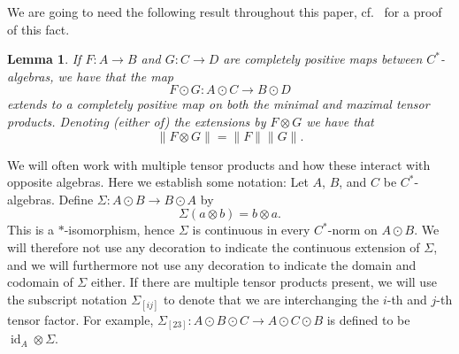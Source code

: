 \documentclass[11pt, a4paper, oneside, final, reqno]{amsart}
\newcommand{\id}{\operatorname{id}}
\theoremstyle{definition}
\theoremstyle{plain}
\newtheorem{lemma}[definition]{Lemma}
\theoremstyle{remark}
\numberwithin{equation}{section}
\begin{document}
We are going to need the following result throughout this paper, cf.~\cite[Theorem 3.5.3]{BO} for a proof of this fact.

\begin{lemma}\label{lemma:Continuity of tensor product maps}
    If $F \colon A \to B$ and $G \colon C \to D$ are completely positive maps between $C^*$-algebras, we have that the map
    \begin{equation*}
        F \odot G \colon A \odot C \to B \odot D
    \end{equation*}
    extends to a completely positive map on both the minimal and maximal tensor products. Denoting (either of) the extensions by $F \otimes G$ we have that
    \begin{equation*}
        \|F \otimes G\| = \|F\|\|G\|.
    \end{equation*}
\end{lemma}

We will often work with multiple tensor products and how these interact with opposite algebras. Here we establish some notation: Let $A$, $B$, and $C$ be $C^*$-algebras. Define $\Sigma \colon A \odot B \to B \odot A$ by
\begin{equation*}
    \Sigma(a \otimes b) = b \otimes a.
\end{equation*}
This is a $*$-isomorphism, hence $\Sigma$ is continuous in every $C^*$-norm on $A \odot B$. We will therefore not use any decoration to indicate the continuous extension of $\Sigma$, and we will furthermore not use any decoration to indicate the domain and codomain of $\Sigma$ either. If there are multiple tensor products present, we will use the subscript notation $\Sigma_{[ij]}$ to denote that we are interchanging the $i$-th and $j$-th tensor factor. For example, $\Sigma_{[23]} \colon A \odot B \odot C \to A \odot C \odot B$ is defined to be $\id_A \otimes \Sigma$.
\end{document}
